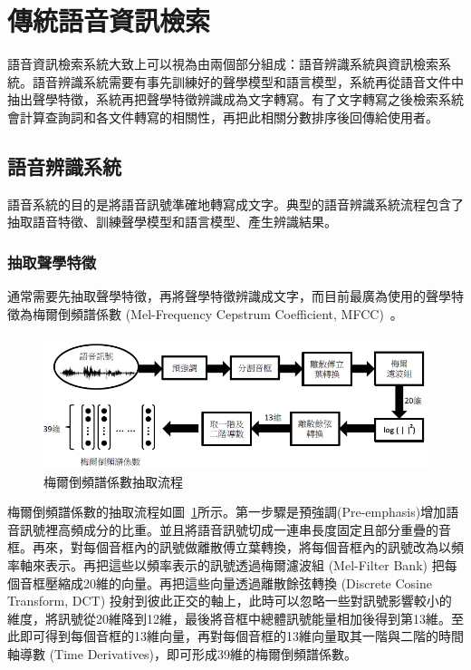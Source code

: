 \section{傳統語音資訊檢索}
語音資訊檢索系統大致上可以視為由兩個部分組成：語音辨識系統與資訊檢索系統。語音辨識系統需要有事先訓練好的聲學模型和語言模型，系統再從語音文件中抽出聲學特徵，系統再把聲學特徵辨識成為文字轉寫。有了文字轉寫之後檢索系統會計算查詢詞和各文件轉寫的相關性，再把此相關分數排序後回傳給使用者。

\subsection{語音辨識系統}
語音系統的目的是將語音訊號準確地轉寫成文字。典型的語音辨識系統流程包含了抽取語音特徵、訓練聲學模型和語言模型、產生辨識結果。

\subsubsection{抽取聲學特徵}
通常需要先抽取聲學特徵，再將聲學特徵辨識成文字，而目前最廣為使用的聲學特徵為梅爾倒頻譜係數 (Mel-Frequency Cepstrum Coefficient, MFCC)~\cite{huang2001spoken}。

\begin{figure}
\centering
\includegraphics[scale=0.7]{images/chap2_mfcc.png}
\caption{梅爾倒頻譜係數抽取流程} \label{fig:chap2_mfcc}
\end{figure}

梅爾倒頻譜係數的抽取流程如圖~\ref{fig:chap2_mfcc}所示。第一步驟是預強調(Pre-emphasis)增加語音訊號裡高頻成分的比重。並且將語音訊號切成一連串長度固定且部分重疊的音框。再來，對每個音框內的訊號做離散傅立葉轉換，將每個音框內的訊號改為以頻率軸來表示。再把這些以頻率表示的訊號透過梅爾濾波組 (Mel-Filter Bank) 把每個音框壓縮成20維的向量。再把這些向量透過離散餘弦轉換 (Discrete Cosine Transform, DCT)
投射到彼此正交的軸上，此時可以忽略一些對訊號影響較小的維度，將訊號從20維降到12維，最後將音框中總體訊號能量相加後得到第13維。至此即可得到每個音框的13維向量，再對每個音框的13維向量取其一階與二階的時間軸導數 (Time Derivatives)，即可形成39維的梅爾倒頻譜係數。

